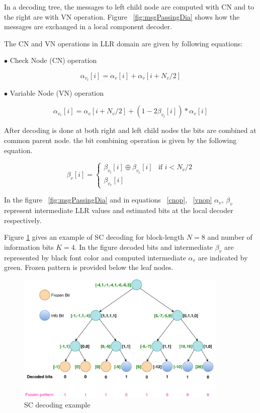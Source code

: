 In a decoding  tree, the messages to left child node are computed with CN and to the right are with VN operation.  Figure ~\ref{fig:msgPassingDia} shows how the messages are exchanged in a local component decoder.

The CN and VN operations in LLR domain are given by following equations:

$\bullet$ Check Node (CN) operation

\begin{equation} \label{cnop}
	\alpha_{v_{l}}[i] = \alpha_{v}[i] + \alpha_{v}[i + N_{v}/2]
\end{equation}

$\bullet$ Variable Node (VN) operation

\begin{equation} \label{vnop}
\alpha_{v_{r}}[i] = \alpha_{v}[i + N_{v}/2] + (1 - 2\beta_{v_{l}}[i]) * \alpha_{v}[i]
\end{equation}

After decoding is done at both right and left child nodes the bits are combined at common parent node. the bit combining operation is given by the following equation.

\begin{equation*} \label{bitCombination}
\beta_{v}[i] = \begin{cases}
				\beta_{v_{l}}[i] \oplus \beta_{v_{r}}[i] & \text{if }i < N_{v}/2 \\
				\beta_{v_{r}}[i]
				\end{cases}
\end{equation*}

In the figure ~\ref{fig:msgPassingDia} and in equations ~\ref{cnop}, ~\ref{vnop}  $\alpha_{v}$, $\beta_{v}$ represent intermediate LLR values and estimated bits at the local decoder respectively.

Figure \ref{fig:scDecodingEg} gives an example of SC decoding for block-length $N=8$ and number of information bits $K=4$. In the figure decoded bits and intermediate $\beta_{v}$ are represented by black font color and computed intermediate $\alpha_{v}$ are indicated by green. Frozen pattern is provided below the leaf nodes.

\begin{figure}[h]
	\centering
	\includegraphics[width=0.9\textwidth]{./figures/SCDecodingExample.pdf}
	\caption{SC decoding example}
	\label{fig:scDecodingEg}
\end{figure}

